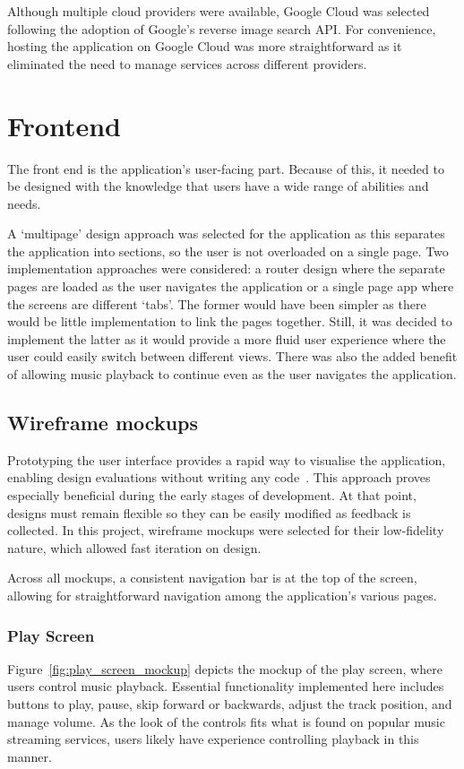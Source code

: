 Although multiple cloud providers were available, Google Cloud was selected following the adoption of Google's reverse image search API. For convenience, hosting the application on Google Cloud was more straightforward as it eliminated the need to manage services across different providers.

\section{Frontend}
The front end is the application's user-facing part. Because of this, it needed to be designed with the knowledge that users have a wide range of abilities and needs.

A `multipage' design approach was selected for the application as this separates the application into sections, so the user is not overloaded on a single page. Two implementation approaches were considered: a router design where the separate pages are loaded as the user navigates the application or a single page app where the screens are different `tabs'. The former would have been simpler as there would be little implementation to link the pages together. Still, it was decided to implement the latter as it would provide a more fluid user experience where the user could easily switch between different views. There was also the added benefit of allowing music playback to continue even as the user navigates the application.

\subsection{Wireframe mockups}
Prototyping the user interface provides a rapid way to visualise the application, enabling design evaluations without writing any code~\cite{WILSON1988859}. This approach proves especially beneficial during the early stages of development. At that point, designs must remain flexible so they can be easily modified as feedback is collected. In this project, wireframe mockups were selected for their low-fidelity nature, which allowed fast iteration on design.

Across all mockups, a consistent navigation bar is at the top of the screen, allowing for straightforward navigation among the application's various pages.

\subsubsection{Play Screen}
Figure~\ref{fig:play_screen_mockup} depicts the mockup of the play screen, where users control music playback. Essential functionality implemented here includes buttons to play, pause, skip forward or backwards, adjust the track position, and manage volume. As the look of the controls fits what is found on popular music streaming services, users likely have experience controlling playback in this manner.

